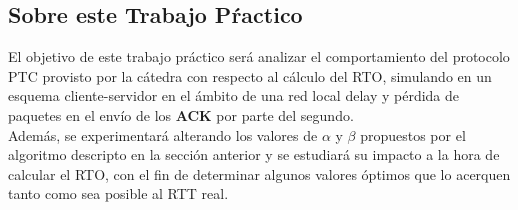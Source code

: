 \subsection{Sobre este Trabajo Pŕactico}

\indent \indent El objetivo de este trabajo práctico será analizar el comportamiento del protocolo PTC provisto por la cátedra con respecto al cálculo del RTO, simulando en un esquema cliente-servidor en el ámbito de una red local delay y pérdida de paquetes en el envío de los \textbf{ACK} por parte del segundo.\\
\indent Además, se experimentará alterando los valores de $\alpha$ y $\beta$ propuestos por el algoritmo descripto en la sección anterior y se estudiará su impacto a la hora de calcular el RTO, con el fin de determinar algunos valores óptimos que lo acerquen tanto como sea posible al RTT real.